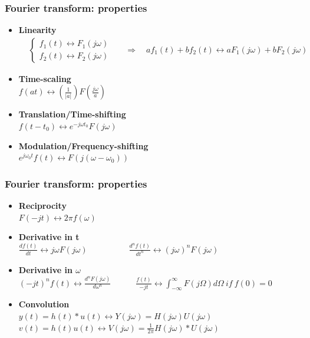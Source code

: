 \begin{frame}
	\frametitle{Fourier transform: properties}
	\begin{itemize}
		\item \textbf{Linearity} \\
		\vspace{-3ex}
		\begin{align*}
		& \begin{cases}
		f_1(t) \leftrightarrow F_1(j\omega)\\
		f_2(t) \leftrightarrow F_2(j\omega)
		\end{cases} && \Rightarrow \quad a f_1(t) + b f_2(t) \leftrightarrow a F_1(j\omega) + b F_2(j \omega)
		\end{align*}
		\item \textbf{Time-scaling} \\
		\medskip
		$f(a t) \leftrightarrow (\frac{1}{|a|}) F(\frac{j \omega}{a})$
		\medskip
		\item \textbf{Translation/Time-shifting} \\
		\medskip
		$f (t - t_0) \leftrightarrow e^{-j \omega t_0} F(j\omega)$
		\medskip
		\item \textbf{Modulation/Frequency-shifting} \\
		\medskip
		$e^{j \omega_0 t} f(t) \leftrightarrow F(j (\omega - \omega_0))$
	\end{itemize}
\end{frame}

\begin{frame}
	\frametitle{Fourier transform: properties}
	\begin{itemize}
		\item \textbf{Reciprocity} \\
		\medskip
		$F(-jt) \leftrightarrow  2 \pi f(\omega)$
		\medskip
		\item \textbf{Derivative in t} \\
		\medskip
		$\frac{df(t)}{dt} \leftrightarrow j\omega F(j\omega) \qquad \qquad \quad \frac{d^nf(t)}{dt^n} \leftrightarrow (j\omega)^n F(j\omega)$
		\medskip
		\item \textbf{Derivative in $\omega$} \\
		\medskip
		$(-jt)^n f(t) \leftrightarrow \frac{d^n F(j\omega)}{d\omega^n} \qquad \quad \frac{f(t)}{-jt} \leftrightarrow \int_{-\infty}^\infty F(j\Omega) d\Omega \> if \> f(0) = 0$
		\medskip
		\item \textbf{Convolution} \\
		\medskip
		$y(t) = h(t) * u(t) \leftrightarrow Y(j\omega) = H(j\omega) U(j\omega)$\\
		$v(t) = h(t)u(t) \leftrightarrow V(j\omega) = \frac{1}{2\pi} H(j\omega)*U(j\omega)$
	\end{itemize}
\end{frame}

